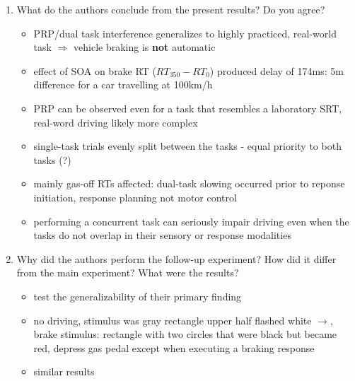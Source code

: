 \documentclass[12pt,english]{scrartcl}
\begin{document}
\begin{enumerate}
\item What do the authors conclude from the present results? Do you agree?
  \color{blue}
\begin{itemize}
 \item PRP/dual task interference generalizes to highly practiced, real-world task $\Rightarrow$ vehicle braking is \textbf{not} automatic
 \item effect of SOA on brake RT ($RT_{350} - RT_{0}$) produced delay of 174ms: 5m difference for a car travelling at 100km/h 
 \item PRP can be observed even for a task that resembles a laboratory SRT, real-word driving likely more complex
 \item single-task trials evenly split between the tasks - equal priority to both tasks (?)
 \item mainly gas-off RTs affected: dual-task slowing occurred prior to reponse initiation, response planning not motor control 
 \item performing a concurrent task can seriously impair driving even when the tasks do not overlap in their sensory or response modalities
 \end{itemize}
  \color{black}

\item Why did the authors perform the follow-up experiment? How did it differ from the main experiment? What were the results?
\color{blue}
 \begin{itemize}
 \item test the generalizability of their primary finding
 \item no driving, stimulus was gray rectangle upper half flashed white $\rightarrow$, brake stimulus: rectangle with two circles that were black but became red, depress gas pedal except when executing a braking response 
 \item similar results
 \end{itemize}
  \color{black}

\end{enumerate}
\end{document}
